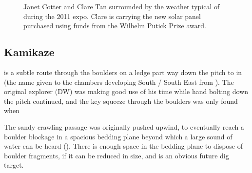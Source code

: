 \begin{figure}[t!]
\checkoddpage \ifoddpage \forcerectofloat \else \forceversofloat \fi
{}
\caption{Janet Cotter and Clare Tan surrounded by the weather typical of \protect{} during the 2011 expo. Clare is carrying the new solar panel purchased using funds from the Wilhelm Putick Prize award. } \label{janet clare clag}
\end{figure}





\subsection{Kamikaze}

 is a subtle route through the boulders on a ledge part
way down the pitch to  in  (the name given to
the chambers developing South / South East from ). The
original explorer (DW) was making good use of his time while hand
bolting down the pitch continued, and the key squeeze through the
boulders was only found when 

The sandy crawling passage was originally pushed upwind, to eventually
reach a boulder blockage in a spacious bedding plane beyond which a
large sound of water can be heard (). There is enough
space in the bedding plane to dispose of boulder fragments, if it can be
reduced in size, and is an obvious future dig target.

